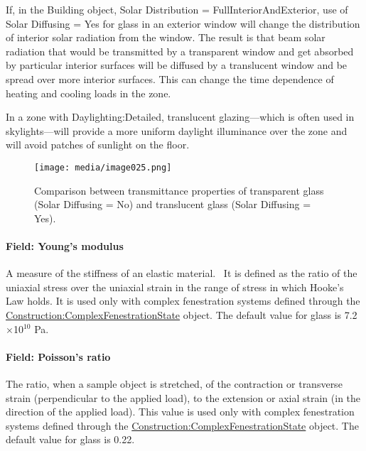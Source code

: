 If, in the Building object, Solar Distribution = FullInteriorAndExterior, use of Solar Diffusing = Yes for glass in an exterior window will change the distribution of interior solar radiation from the window. The result is that beam solar radiation that would be transmitted by a transparent window and get absorbed by particular interior surfaces will be diffused by a translucent window and be spread over more interior surfaces. This can change the time dependence of heating and cooling loads in the zone.

In a zone with Daylighting:Detailed, translucent glazing---which is often used in skylights---will provide a more uniform daylight illuminance over the zone and will avoid patches of sunlight on the floor.

\begin{figure}[hbtp] %
\centering
\texttt{[image: media/image025.png]}
\caption{Comparison between transmittance properties of transparent glass (Solar Diffusing = No) and translucent glass (Solar Diffusing = Yes). \protect \label{fig:comparison-between-transmittance-properties}}
\end{figure}

\paragraph{Field: Young's modulus}\label{field-youngs-modulus}

A measure of the stiffness of an elastic material.~ It is defined as the ratio of the uniaxial stress over the uniaxial strain in the range of stress in which Hooke's Law holds. It is used only with complex fenestration systems defined through the \hyperref[constructioncomplexfenestrationstate]{Construction:ComplexFenestrationState} object. The default value for glass is 7.2$\times$10$^{10}$ Pa.

\paragraph{Field: Poisson's ratio}\label{field-poissons-ratio}

The ratio, when a sample object is stretched, of the contraction or transverse strain (perpendicular to the applied load), to the extension or axial strain (in the direction of the applied load). This value is used only with complex fenestration systems defined through the \hyperref[constructioncomplexfenestrationstate]{Construction:ComplexFenestrationState} object. The default value for glass is 0.22.

